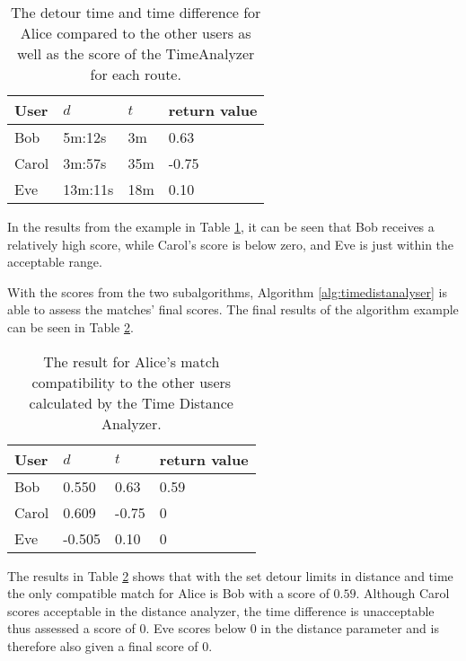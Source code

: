 \begin{table}[!ht]
\centering
\begin{tabular}{@{}llll@{}}
\toprule
\textbf{User} 	& \textbf{$d$} & \textbf{$t$} 	& \textbf{return value} \\ \midrule
Bob         	& 5m:12s       & 3m			    & 0.63				\\
Carol         	& 3m:57s       & 35m	      	& -0.75       		\\
Eve           	& 13m:11s      & 18m			& 0.10        		\\ \bottomrule
\end{tabular}
\caption{The detour time and time difference for Alice compared to the other users as well as the score of the TimeAnalyzer for each route.}
\label{tbl:time}
\end{table}
 
In the results from the example in Table \ref{tbl:time}, it can be seen that Bob receives a relatively high score, while Carol's score is below zero, and Eve is just within the acceptable range. 

With the scores from the two subalgorithms, Algorithm \ref{alg:timedistanalyser} is able to assess the matches' final scores.
The final results of the algorithm example can be seen in Table \ref{tbl:timedist}.

\begin{table}[!ht]
\centering
\begin{tabular}{@{}llll@{}}
\toprule
\textbf{User} 	& \textbf{$d$} & \textbf{$t$} 	& \textbf{return value} \\ \midrule
Bob         	& 0.550 	   & 0.63		    & 0.59					\\
Carol         	& 0.609        & -0.75	      	& 0       				\\
Eve           	& -0.505       & 0.10			& 0        				\\ \bottomrule
\end{tabular}
\caption{The result for Alice's match compatibility to the other users calculated by the Time Distance Analyzer.}
\label{tbl:timedist}
\end{table}

The results in Table \ref{tbl:timedist} shows that with the set detour limits in distance and time the only compatible match for Alice is Bob with a score of $0.59$. 
Although Carol scores acceptable in the distance analyzer, the time difference is unacceptable thus assessed a score of $0$.
Eve scores below 0 in the distance parameter and is therefore also given a final score of $0$.

